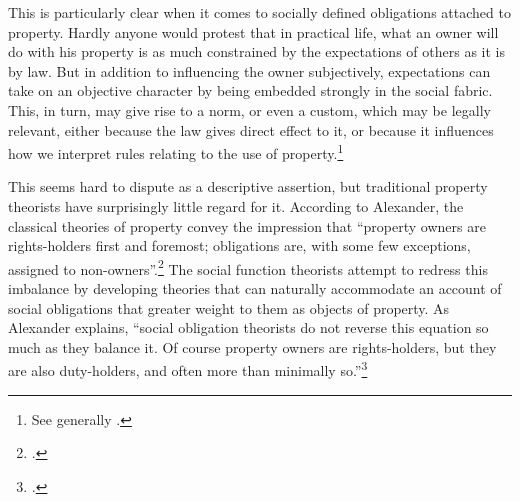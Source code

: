 This is particularly clear when it comes to socially defined obligations attached to property. Hardly anyone would protest that in practical life, what an owner will do with his property is as much constrained by the expectations of others as it is by law. But in addition to influencing the owner subjectively, expectations can take on an objective character by being embedded strongly in the social fabric. This, in turn, may give rise to a norm, or even a custom, which may be legally relevant, either because the law gives direct effect to it, or because it influences how we interpret rules relating to the use of property.\footnote{See generally \cite{penalver09,alexander09}.}

This seems hard to dispute as a descriptive assertion, but traditional property theorists have surprisingly little regard for it. According to Alexander, the classical theories of property convey the impression that ``property owners are rights-holders first and foremost; obligations are, with some few exceptions, assigned to non-owners''.\footcite[1023]{alexander11} The social function theorists attempt to redress this imbalance by developing theories that can naturally accommodate an account of social obligations that  greater weight to them as objects of property. As Alexander explains, ``social obligation theorists do not reverse this equation so much as they balance it. Of course property owners are rights-holders, but they are also duty-holders, and often more than minimally so.''\footcite[1023]{alexander11} 

